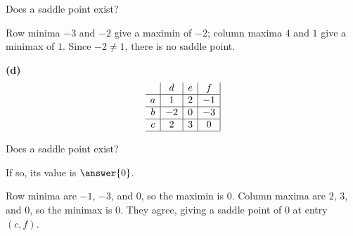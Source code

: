 \documentclass[12pt]{ximera}
\begin{document}
\begin{problem}
\begin{prompt}
Does a saddle point exist?
\begin{multipleChoice}
\end{multipleChoice}

\begin{feedback}
Row minima $-3$ and $-2$ give a maximin of $-2$; column maxima $4$ and $1$ give a
minimax of $1$. Since $-2\neq 1$, there is no saddle point.
\end{feedback}
\end{prompt}

\begin{prompt}
\textbf{(d)}
\[
\begin{array}{c|c|c|c|}
\phantom{|} & d & e & f \\\hline
a & 1 & 2 & -1 \\\hline
b & -2 & 0 & -3 \\\hline
c & 2 & 3 & 0 \\\hline
\end{array}
\]

Does a saddle point exist?
\begin{multipleChoice}
\end{multipleChoice}

If so, its value is $\answer{0}$.

\begin{feedback}
Row minima are $-1$, $-3$, and $0$, so the maximin is $0$. Column maxima are $2$, $3$,
and $0$, so the minimax is $0$. They agree, giving a saddle point of $0$ at entry
$(c,f)$.
\end{feedback}
\end{prompt}
\end{problem}
\end{document}

